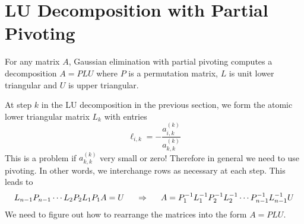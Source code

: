\section{LU Decomposition with Partial Pivoting}

\begin{bigidea}
For any matrix $A$, Gaussian elimination with partial pivoting computes a decomposition $A = PLU$ where $P$ is a permutation matrix, $L$ is unit lower triangular and $U$ is upper triangular.
\end{bigidea}

\begin{note}
At step $k$ in the LU decomposition in the previous section, we form the atomic lower triangular matrix $L_k$ with entries
$$
\ell_{i,k} = - \frac{a_{i,k}^{(k)}}{a_{k,k}^{(k)}}
$$
This is a problem if $a_{k,k}^{(k)}$ very small or zero! Therefore in general we need to use pivoting. In other words, we interchange rows as necessary at each step. This leads to
$$
L_{n-1}P_{n-1} \cdots L_2 P_2 L_1 P_1 A = U
\hspace{5mm}
\Rightarrow
\hspace{5mm}
A = P_1^{-1}L_1^{-1} P_2^{-1}L_2^{-1} \cdots P_{n-1}^{-1} L_{n-1}^{-1} U
$$
We need to figure out how to rearrange the matrices into the form $A = PLU$.
\end{note}

